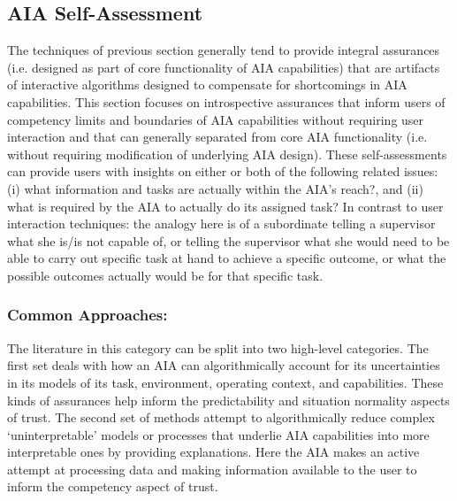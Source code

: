 \subsection{AIA Self-Assessment} \label{sec:aia_self_assessment}

The techniques of previous section generally tend to provide integral assurances (i.e. designed as part of core functionality of AIA capabilities) that are artifacts of interactive algorithms designed to compensate for shortcomings in AIA capabilities. This section focuses on introspective assurances that inform users of competency limits and boundaries of AIA capabilities without requiring user interaction and that can generally separated from core AIA functionality (i.e. without requiring modification of underlying AIA design).  These self-assessments can provide users with insights on either or both of the following related issues: (i) what information and tasks are actually within the AIA's reach?, and (ii) what is required by the AIA to actually do its assigned task? 
In contrast to user interaction techniques: the analogy here is of a subordinate telling a supervisor what she is/is not capable of, or telling the supervisor what she would need to be able to carry out specific task at hand to achieve a specific outcome, or what the possible outcomes actually would be for that specific task. 


\subsubsection{Common Approaches:}
The literature in this category can be split into two high-level categories. 
The first set deals with how an AIA can algorithmically account for its uncertainties in its models of its task, environment, operating context, and capabilities. 
These kinds of assurances help inform the predictability and situation normality aspects of trust. 
The second set of methods attempt to algorithmically reduce complex `uninterpretable' models or processes that underlie AIA capabilities into more interpretable ones by providing explanations. 
Here the AIA makes an active attempt at processing data and making information available to the user to inform the competency aspect of trust. %

